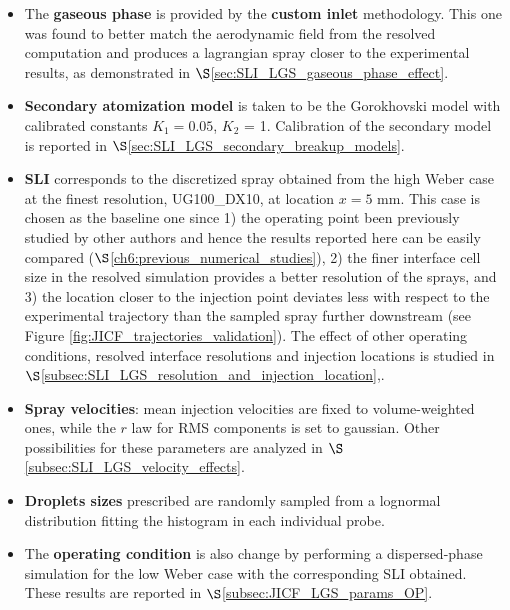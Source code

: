 \begin{itemize}

	\item The \textbf{gaseous phase} is provided by the \textbf{custom inlet} methodology. This one was found to better match the aerodynamic field from the resolved computation and produces a lagrangian spray closer to the experimental results, as demonstrated in $\S$\ref{sec:SLI_LGS_gaseous_phase_effect}.
	
	\item \textbf{Secondary atomization model} is taken to be the Gorokhovski model with calibrated constants $K_1 = 0.05$, $K_2$ = 1. Calibration of the secondary model is reported in $\S$\ref{sec:SLI_LGS_secondary_breakup_models}.
	
	\item \textbf{SLI} corresponds to the discretized spray obtained from the high Weber case at the finest resolution, UG100\_DX10, at location $x = 5$ mm. This case is chosen as the baseline one since 1) the operating point been previously studied by other authors and hence the results reported here can be easily compared ($\S$\ref{ch6:previous_numerical_studies}), 2) the finer interface cell size in the resolved simulation provides a better resolution of the sprays, and 3) the location closer to the injection point deviates less with respect to the experimental trajectory than the sampled spray further downstream (see Figure \ref{fig:JICF_trajectories_validation}). The effect of other operating conditions, resolved interface resolutions and injection locations is studied in $\S$\ref{subsec:SLI_LGS_resolution_and_injection_location},.
	
	\item \textbf{Spray velocities}: mean injection velocities are fixed to volume-weighted ones, while the $r$ law for RMS components is set to gaussian. Other possibilities for these parameters are analyzed in $\S$\ref{subsec:SLI_LGS_velocity_effects}.
	
	\item \textbf{Droplets sizes} prescribed are randomly sampled from a lognormal distribution fitting the histogram in each individual probe. 
	
	\item The \textbf{operating condition} is also change by performing a dispersed-phase simulation for the low Weber case with the corresponding SLI obtained. These results are reported in $\S$\ref{subsec:JICF_LGS_params_OP}.

\end{itemize}






